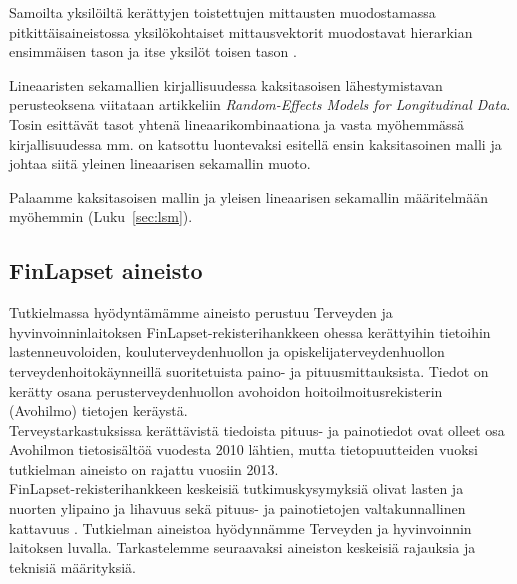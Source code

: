 \documentclass[finnish]{docopts}
\begin{document}
Samoilta yksilöiltä kerättyjen toistettujen mittausten muodostamassa pitkittäisaineistossa yksilökohtaiset mittausvektorit muodostavat hierarkian ensimmäisen tason ja itse yksilöt toisen tason \cite{goldstein11}.


Lineaaristen sekamallien kirjallisuudessa kaksitasoisen lähestymistavan perusteoksena viitataan \cite{laird82} artikkeliin \textit{Random-Effects Models for Longitudinal Data}. Tosin \cite{laird82} esittävät tasot yhtenä lineaarikombinaationa ja vasta myöhemmässä kirjallisuudessa mm. \cite{verbeke00, talbott06} on katsottu luontevaksi esitellä ensin kaksitasoinen malli ja johtaa siitä \cite{laird82} yleinen lineaarisen sekamallin muoto.

Palaamme kaksitasoisen mallin ja yleisen lineaarisen sekamallin määritelmään myöhemmin (Luku~\ref{sec:lsm}).\\

\subsection{FinLapset aineisto}
\label{sub:finlapsetdata}

Tutkielmassa hyödyntämämme aineisto perustuu Terveyden ja hyvinvoinninlaitoksen FinLapset-rekisterihankkeen \cite{finlapsetrekisteri} ohessa kerättyihin tietoihin lastenneuvoloiden, kouluterveydenhuollon ja opiskelijaterveydenhuollon terveydenhoitokäynneillä suoritetuista paino- ja pituusmittauksista. Tiedot on kerätty osana perusterveydenhuollon avohoidon hoitoilmoitusrekisterin (Avohilmo) tietojen keräystä.\\

Terveystarkastuksissa kerättävistä tiedoista pituus- ja painotiedot ovat olleet osa Avohilmon tietosisältöä vuodesta 2010 lähtien, mutta tietopuutteiden vuoksi tutkielman aineisto on rajattu vuosiin 2013.\\

FinLapset-rekisterihankkeen keskeisiä tutkimuskysymyksiä olivat lasten ja nuorten ylipaino ja lihavuus sekä pituus- ja painotietojen valtakunnallinen kattavuus \cite{finlapsetrekisteri}. Tutkielman aineistoa hyödynnämme Terveyden ja hyvinvoinnin laitoksen luvalla. Tarkastelemme seuraavaksi aineiston keskeisiä rajauksia ja teknisiä määrityksiä. \\
\end{document}
